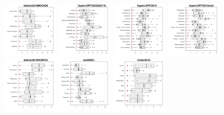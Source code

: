 \documentclass[12pt]{article}\usepackage[]{graphicx}\usepackage[]{color}
\begin{document}
\begin{figure}[p]
  \centering
  \includegraphics[width = 0.24\textwidth]{./figure/allqseps-1.pdf}
  \includegraphics[width = 0.24\textwidth]{./figure/allqseps-2.pdf}
  \includegraphics[width = 0.24\textwidth]{./figure/allqseps-3.pdf}
  \includegraphics[width = 0.24\textwidth]{./figure/allqseps-4.pdf}
  \includegraphics[width = 0.24\textwidth]{./figure/allqseps-5.pdf}
  \includegraphics[width = 0.24\textwidth]{./figure/allqseps-6.pdf}
  \includegraphics[width = 0.24\textwidth]{./figure/allqseps-7.pdf}

\end{figure}
\end{document}
